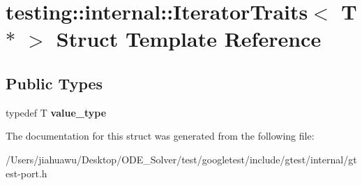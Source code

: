 \hypertarget{structtesting_1_1internal_1_1_iterator_traits_3_01_t_01_5_01_4}{}\section{testing\+:\+:internal\+:\+:Iterator\+Traits$<$ T $\ast$ $>$ Struct Template Reference}
\label{structtesting_1_1internal_1_1_iterator_traits_3_01_t_01_5_01_4}
\subsection*{Public Types}
\begin{DoxyCompactItemize}
\item 
\mbox{\label{structtesting_1_1internal_1_1_iterator_traits_3_01_t_01_5_01_4_a7e46869ed36cc5aea898e243d270a8be}} 
typedef T {\bfseries value\+\_\+type}
\end{DoxyCompactItemize}


The documentation for this struct was generated from the following file\+:\begin{DoxyCompactItemize}
\item 
/\+Users/jiahuawu/\+Desktop/\+O\+D\+E\+\_\+\+Solver/test/googletest/include/gtest/internal/gtest-\/port.\+h\end{DoxyCompactItemize}
